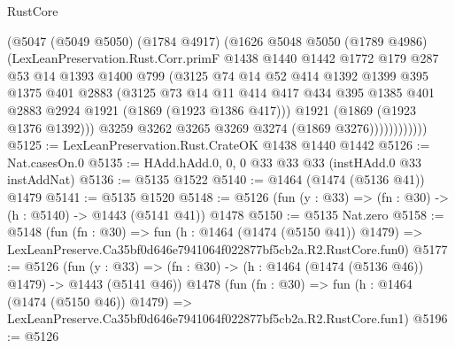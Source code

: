 \begin{lexlean}{RustCore}
\begin{coremodule}
                    (@5047
                      (@5049 @5050)
                      (@1784 @4917)
                      (@1626
                        @5048
                        @5050
                        (@1789 @4986)
                        (LexLeanPreservation.Rust.Corr.primF
                          @1438
                          @1440
                          @1442
                          @1772
                          @179
                          @287
                          @53
                          @14
                          @1393
                          @1400
                          @799
                          (@3125
                            @74
                            @14
                            @52
                            @414
                            @1392
                            @1399
                            @395
                            @1375
                            @401
                            @2883
                            (@3125
                              @73
                              @14
                              @11
                              @414
                              @417
                              @434
                              @395
                              @1385
                              @401
                              @2883
                              @2924
                              @1921
                              (@1869 (@1923 @1386 @417)))
                            @1921
                            (@1869 (@1923 @1376 @1392)))
                          @3259
                          @3262
                          @3265
                          @3269
                          @3274
                          (@1869 @3276))))))))))))
@5125 := LexLeanPreservation.Rust.CrateOK @1438 @1440 @1442
@5126 := Nat.casesOn.{0}
@5135 := HAdd.hAdd.{0, 0, 0} @33 @33 @33 (instHAdd.{0} @33 instAddNat)
@5136 := @5135 @1522
@5140 := @1464 (@1474 (@5136 @41)) @1479
@5141 := @5135 @1520
@5148 := @5126 (fun (y : @33) => (fn : @30) -> (h : @5140) -> @1443 (@5141 @41)) @1478
@5150 := @5135 Nat.zero
@5158 := @5148
    (fun (fn : @30) =>
    fun (h : @1464 (@1474 (@5150 @41)) @1479) =>
    LexLeanPreserve.Ca35bf0d646e7941064f022877bf5cb2a.R2.RustCore.fun0)
@5177 := @5126
    (fun (y : @33) => (fn : @30) -> (h : @1464 (@1474 (@5136 @46)) @1479) -> @1443 (@5141 @46))
    @1478
    (fun (fn : @30) =>
    fun (h : @1464 (@1474 (@5150 @46)) @1479) =>
    LexLeanPreserve.Ca35bf0d646e7941064f022877bf5cb2a.R2.RustCore.fun1)
@5196 := @5126

\end{coremodule}
\end{lexlean}
